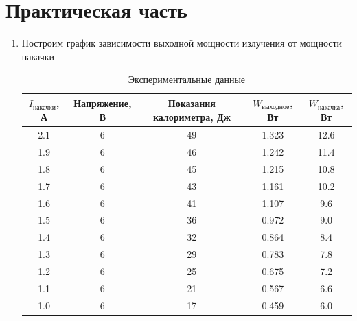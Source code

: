 \documentclass[a4paper, 12pt]{article}
\begin{document}
	\section{Практическая часть}
	\begin{enumerate}
		\item Построим график зависимости выходной мощности излучения от мощности накачки
		\begin{table}[h]
			\centering
			\caption{Экспериментальные данные}
			\begin{tabular}{|c|c|c|c|c|}
				\hline
				$I_{\text{накачки}}$, А & Напряжение, В & Показания калориметра, Дж & $W_{\text{выходное}}$, Вт & $W_{\text{накачка}}$, Вт\\
				\hline
				2.1 & 6 & 49 & 1.323 & 12.6\\
 				1.9 & 6 & 46 & 1.242 & 11.4\\
			 	1.8 & 6 & 45 & 1.215 & 10.8\\
 				1.7 & 6 & 43 & 1.161 & 10.2\\
 				1.6 & 6 & 41 & 1.107 & 9.6\\
 				1.5 & 6 & 36 & 0.972 & 9.0\\
			 	1.4 & 6 & 32 & 0.864 & 8.4\\
 				1.3 & 6 & 29 & 0.783 & 7.8\\
 				1.2 & 6 & 25 & 0.675 & 7.2\\
 				1.1 & 6 & 21 & 0.567 & 6.6\\
 				1.0 & 6 & 17 & 0.459  & 6.0\\
 				\hline
			\end{tabular}
		\end{table}
		\begin{figure}[!htb]

\end{figure}
\end{enumerate}
\end{document}
